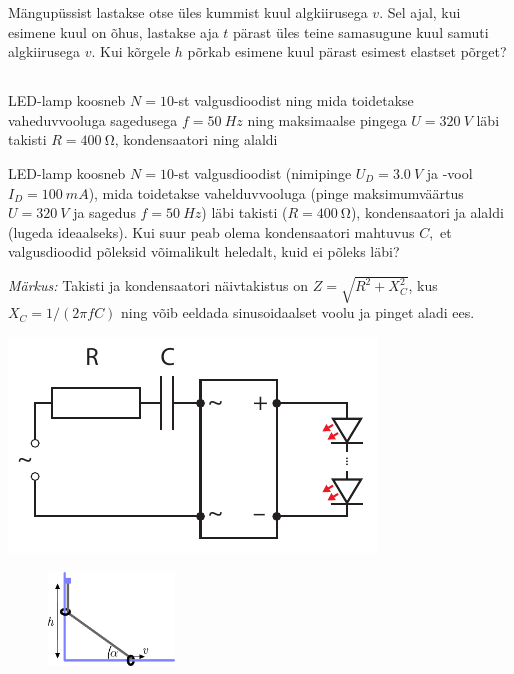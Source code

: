 \documentclass[10pt]{article}
\begin{document}
Mängupüssist lastakse otse üles kummist kuul algkiirusega $v$. Sel ajal, kui esimene kuul on õhus, lastakse aja $t$ pärast üles teine samasugune kuul samuti algkiirusega $v$. Kui kõrgele $h$ põrkab esimene kuul pärast esimest elastset põrget?
\probend
\bigskip
\newpage\subsection{\protect{}}


LED-lamp koosneb $N=10$-st valgusdioodist ning mida toidetakse vaheduvvooluga sagedusega $f=\SI{50}{Hz}$ ning maksimaalse pingega $U=\SI{320}{V}$ läbi takisti $R=\SI{400}{\ohm}$, kondensaatori ning alaldi

LED-lamp koosneb $N=10$-st valgusdioodist (nimipinge $U_{D}=\SI{3.0}{V}$ ja -vool $I_{D}=\SI{100}{mA}$), mida toidetakse vahelduvvooluga (pinge maksimumväärtus $U=\SI{320}{V}$ ja sagedus $f=\SI{50}{Hz}$) läbi takisti ($R=\SI{400}{\ohm}$), kondensaatori ja alaldi (lugeda ideaalseks). Kui suur peab olema kondensaatori mahtuvus $C,$ et valgusdioodid põleksid võimalikult heledalt, kuid ei põleks läbi?

\emph{Märkus:} Takisti ja kondensaatori näivtakistus on $Z=\sqrt{R^{2}+X_{C}^{2}}$, kus $X_{C}=1/\left(2\pi fC\right)$ ning võib eeldada sinusoidaalset voolu ja pinget aladi ees.
\begin{center}
	\includegraphics[width=0.6\linewidth]{2019-lahg-06-yl.pdf}
\end{center}
\probend
\bigskip


\begin{figure}
	\vspace{-5pt}
	\includegraphics[width=0.3\textwidth]{2019-lahg-07-yl.pdf}
\end{figure}
\end{document}
